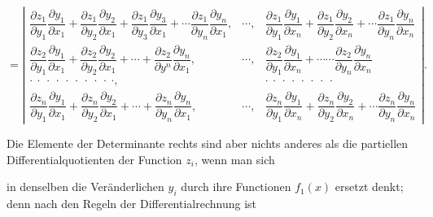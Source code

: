 \[
=
\left|
\begin{array}{lll}
\dfrac{\partial z_1}{\partial y_1}\dfrac{\partial y_1}{\partial x_1}+\dfrac{\partial z_1}{\partial y_2}\dfrac{\partial y_2}{\partial x_1}+\dfrac{\partial z_1}{\partial y_3}\dfrac{\partial y_3}{\partial x_1}+\cdots\dfrac{\partial z_1}{\partial y_n}\dfrac{\partial y_n}{\partial x_1}, & \cdots, & \dfrac{\partial z_1}{\partial y_1}\dfrac{\partial y_1}{\partial x_n}+\dfrac{\partial z_1}{\partial y_2}\dfrac{\partial y_2}{\partial x_n}+\cdots\dfrac{\partial z_1}{\partial y_n}\dfrac{\partial y_n}{\partial x_n} \\[2ex]
\dfrac{\partial z_2}{\partial y_1}\dfrac{\partial y_1}{\partial x_1}+\dfrac{\partial z_2}{\partial y_2}\dfrac{\partial y_2}{\partial x_1}+\cdots+\dfrac{\partial z_2}{\partial y^n}\dfrac{\partial y_n}{\partial x_1}, & \cdots, & \dfrac{\partial z_2}{\partial y_1}\dfrac{\partial y_1}{\partial x_n}+\cdots\cdots\dfrac{\partial z_2}{\partial y_n}\dfrac{\partial y_n}{\partial x_n} \\[2ex]
\cdot\ \cdot\ \cdot\ \cdot\ \cdot\ \cdot\ \cdot\ \cdot\ \cdot\ \cdot, & & \cdot\ \cdot\ \cdot\ \cdot\ \cdot\ \cdot\ \cdot\ \cdot \\[2ex]
\dfrac{\partial z_n}{\partial y_1}\dfrac{\partial y_1}{\partial x_1}+\dfrac{\partial z_n}{\partial y_2}\dfrac{\partial y_2}{\partial x_1}+\cdots+\dfrac{\partial z_n}{\partial y_n}\dfrac{\partial y_n}{\partial x_1}, & \cdots, & \dfrac{\partial z_n}{\partial y_1}\dfrac{\partial y_1}{\partial x_n}+\dfrac{\partial z_n}{\partial y_2}\dfrac{\partial y_2}{\partial x_n}+\cdots\dfrac{\partial z_n}{\partial y_n}\dfrac{\partial y_n}{\partial x_n}
\end{array}
\right|.
\]

Die Elemente der Determinante rechts sind aber nichts anderes als
die partiellen Differentialquotienten der Function $z_i$, wenn man sich


in denselben die Veränderlichen $y_i$ durch ihre Functionen $f_1(x)$ ersetzt
denkt; denn nach den Regeln der Differentialrechnung ist


